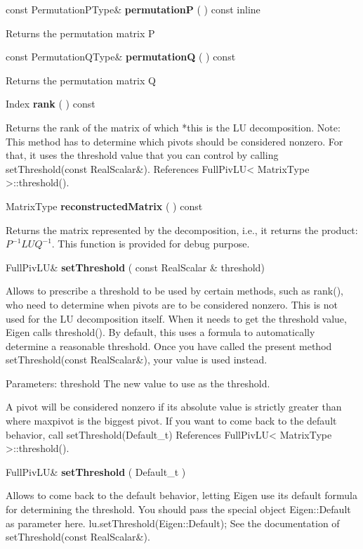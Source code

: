 \vspace{0.3cm}
const PermutationPType\& \textbf{permutationP}  ( )  const 
inline  

Returns the permutation matrix P


\vspace{0.3cm}
const PermutationQType\& \textbf{permutationQ}  ( )  const 

Returns the permutation matrix Q


\vspace{0.3cm}
Index \textbf{rank}  ( )  const 

Returns the rank of the matrix of which *this is the LU decomposition.
Note: This method has to determine which pivots should be considered nonzero. For that, it uses the threshold value that you can control by calling setThreshold(const RealScalar\&). References FullPivLU< MatrixType >::threshold().


\vspace{0.3cm}
MatrixType \textbf{reconstructedMatrix}  ( )  const 

Returns the matrix represented by the decomposition, i.e., it returns the product: $P^{-1} L U Q^{-1}$. This function is provided for debug purpose. 


\vspace{0.3cm}
FullPivLU\& \textbf{setThreshold}  ( const RealScalar \&  threshold)   

Allows to prescribe a threshold to be used by certain methods, such as rank(), who need to determine when pivots are to be considered nonzero. This is not used for the LU decomposition itself.
When it needs to get the threshold value, Eigen calls threshold(). By default, this uses a formula to automatically determine a reasonable threshold. Once you have called the present method setThreshold(const RealScalar\&), your value is used instead.

Parameters: threshold The new value to use as the threshold. 

A pivot will be considered nonzero if its absolute value is strictly greater than  where maxpivot is the biggest pivot.
If you want to come back to the default behavior, call setThreshold(Default\_t) 
References FullPivLU< MatrixType >::threshold().


\vspace{0.3cm}
FullPivLU\& \textbf{setThreshold}  ( Default\_t  )   

Allows to come back to the default behavior, letting Eigen use its default formula for determining the threshold.
You should pass the special object Eigen::Default as parameter here. 
lu.setThreshold(Eigen::Default); See the documentation of setThreshold(const RealScalar\&). 


